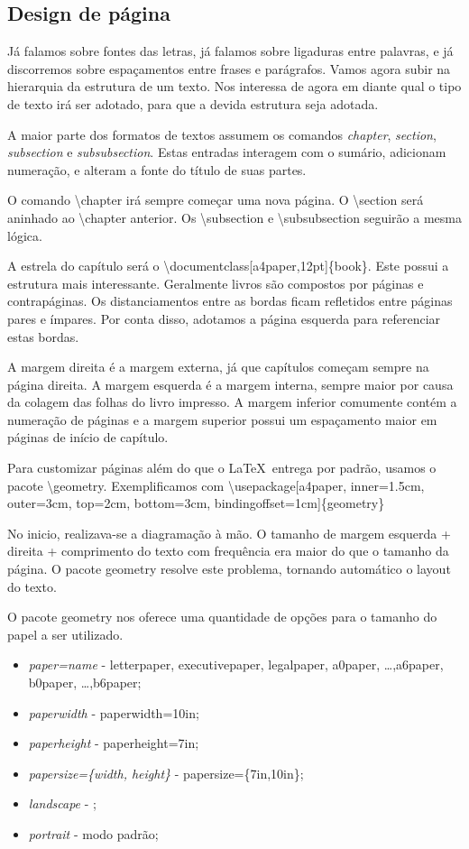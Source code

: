 \begin{landscape}
\chapter{Design de página}
Já falamos sobre fontes das letras, já falamos sobre ligaduras entre palavras, e já discorremos sobre espaçamentos entre frases e parágrafos.
Vamos agora subir na hierarquia da estrutura de um texto.
Nos interessa de agora em diante qual o tipo de texto irá ser adotado, para que a devida estrutura seja adotada.

A maior parte dos formatos de textos assumem os comandos \emph{chapter}, \emph{section}, \emph{subsection} e \emph{subsubsection}.
Estas entradas interagem com o sumário, adicionam numeração, e alteram a fonte do título de suas partes.

O comando \textbackslash chapter irá sempre começar uma nova página. O \textbackslash section será aninhado ao \textbackslash chapter anterior. Os \textbackslash subsection e \textbackslash subsubsection seguirão a mesma lógica.

A estrela do capítulo será o \textbackslash documentclass[a4paper,12pt]\{book\}.
Este possui a estrutura mais interessante. Geralmente livros são compostos por páginas e contrapáginas.
Os distanciamentos entre as bordas ficam refletidos entre páginas pares e ímpares.
Por conta disso, adotamos a página esquerda para referenciar estas bordas.

A margem direita é a margem externa, já que capítulos começam sempre na página direita.
A margem esquerda é a margem interna, sempre maior por causa da colagem das folhas do livro impresso.
A margem inferior comumente contém a numeração de páginas e a margem superior possui um espaçamento maior em páginas de início de capítulo.

Para customizar páginas além do que o \LaTeX\ entrega por padrão, usamos o pacote \textbackslash geometry. 
Exemplificamos com 
\textbackslash usepackage[a4paper, inner=1.5cm, outer=3cm, top=2cm, bottom=3cm, bindingoffset=1cm]\{geometry\}

No inicio, realizava-se a diagramação à mão.
O tamanho de margem esquerda + direita + comprimento do texto com frequência era maior do que o tamanho da página.
O pacote geometry resolve este problema, tornando automático o layout do texto.

O pacote geometry nos oferece uma quantidade de opções para o tamanho do papel a ser utilizado.
\end{landscape}
\begin{itemize}
    \item \emph{paper=name} - letterpaper, executivepaper, legalpaper, a0paper, \ldots ,a6paper, b0paper, \ldots ,b6paper;
    \item \emph{paperwidth} - paperwidth=10in;
    \item \emph{paperheight} - paperheight=7in;
    \item \emph{papersize=\{width, height\}} - papersize=\{7in,10in\};
    \item \emph{landscape} - ;
    \item \emph{portrait} - modo padrão;
\end{itemize}

